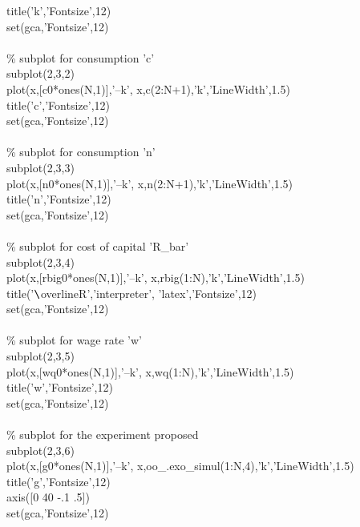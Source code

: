 \documentclass[a4paper,12pt]{scrartcl} %
\begin{document}
title('k','Fontsize',12)\\
set(gca,'Fontsize',12)\\
\\
\% subplot for consumption 'c'\\
subplot(2,3,2)\\
plot(x,[c0*ones(N,1)],'--k', x,c(2:N+1),'k','LineWidth',1.5)\\
title('c','Fontsize',12)\\
set(gca,'Fontsize',12)\\
\\
\% subplot for consumption 'n'\\
subplot(2,3,3)\\
plot(x,[n0*ones(N,1)],'--k', x,n(2:N+1),'k','LineWidth',1.5)\\
title('n','Fontsize',12)\\
set(gca,'Fontsize',12)\\
\\
\% subplot for cost of capital 'R\_bar'\\
subplot(2,3,4)\\
plot(x,[rbig0*ones(N,1)],'--k', x,rbig(1:N),'k','LineWidth',1.5)\\
title('$\verb|\|$overline{R}','interpreter', 'latex','Fontsize',12)\\
set(gca,'Fontsize',12)\\
\\
\% subplot for wage rate 'w'\\
subplot(2,3,5)\\
plot(x,[wq0*ones(N,1)],'--k', x,wq(1:N),'k','LineWidth',1.5)\\
title('w','Fontsize',12)\\
set(gca,'Fontsize',12)\\
\\
\% subplot for the experiment proposed\\
subplot(2,3,6)\\
plot(x,[g0*ones(N,1)],'--k', x,oo\_.exo\_simul(1:N,4),'k','LineWidth',1.5)\\
title('g','Fontsize',12)\\
axis([0 40 -.1 .5])\\
set(gca,'Fontsize',12)\\
\end{document}
